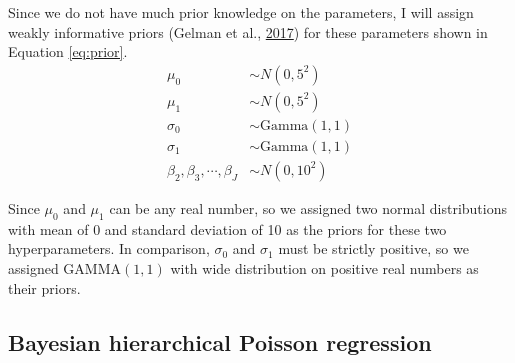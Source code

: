 \documentclass[12pt]{book}
\numberwithin{equation}{chapter}
\begin{document}
Since we do not have much prior knowledge on the parameters, I will assign weakly informative priors (Gelman et al., \protect\hyperlink{ref-gelman2017prior}{2017}) for these parameters shown in Equation \eqref{eq:prior}.
\begin{equation}
\begin{split}
        \mu_0 & \sim N(0, 5^2)\\
        \mu_1 & \sim N(0, 5^2)\\
        \sigma_0 & \sim \text{Gamma}(1, 1)\\
        \sigma_1 & \sim \text{Gamma}(1, 1)\\
        \beta_2, \beta_3, \cdots, \beta_J  & \sim N(0, 10^2)
        \label{eq:prior}
\end{split}
\end{equation}

Since \(\mu_0\) and \(\mu_1\) can be any real number, so we assigned two normal distributions with mean of 0 and standard deviation of 10 as the priors for these two hyperparameters. In comparison, \(\sigma_0\) and \(\sigma_1\) must be strictly positive, so we assigned GAMMA\((1, 1)\) with wide distribution on positive real numbers as their priors.

\hypertarget{bayesian-hierarchical-poisson-regression}{%
\subsection{Bayesian hierarchical Poisson regression}\label{bayesian-hierarchical-poisson-regression}}
\end{document}

